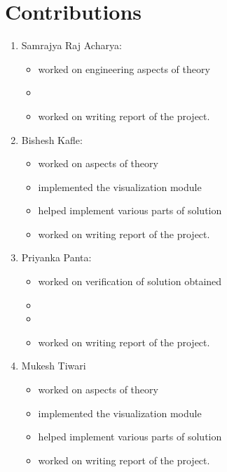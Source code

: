 
	\chapter{Contributions}
	\begin{enumerate}
		\item  Samrajya Raj Acharya:
		   \begin{itemize}
		   \item worked on engineering aspects of theory
		   \item 
		   \item  worked on writing report of the project.
		   \end{itemize}
	   
		 \item  Bishesh Kafle:
		 \begin{itemize}
		 	\item worked on aspects of theory
			\item implemented the visualization module
			\item helped implement various parts of solution
		 	\item  worked on writing report of the project.
		 \end{itemize}
		 
		 \item  Priyanka Panta:
		 \begin{itemize}
		 	\item worked on verification of solution obtained
		 	\item 
		 	\item 
		 	\item  worked on writing report of the project.
		 \end{itemize}
		 
		 
		 \item  Mukesh Tiwari	 
		 \begin{itemize}
		 	\item worked on aspects of theory
		 	\item implemented the visualization module
		 	\item helped implement various parts of solution
		 	\item  worked on writing report of the project.
		 \end{itemize}
	\end{enumerate}
